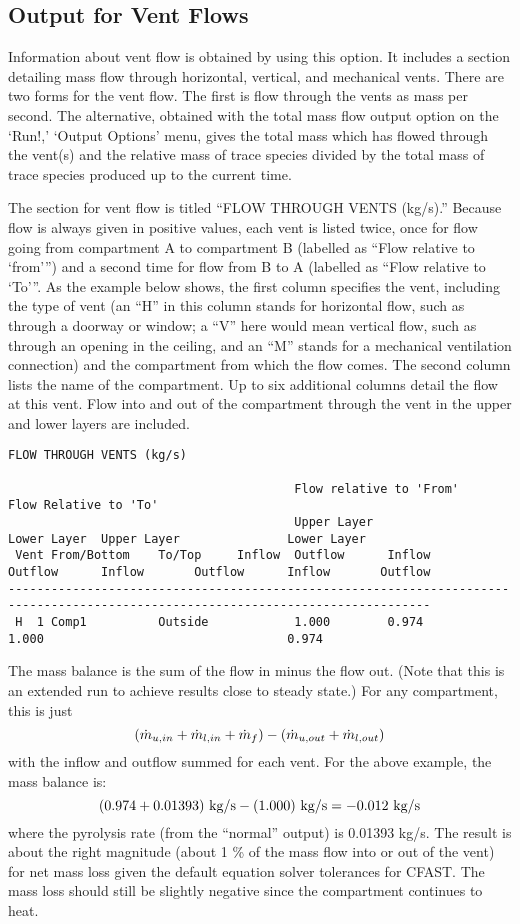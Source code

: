 \subsection{Output for Vent Flows}

Information about vent flow is obtained by using this option.  It includes a section detailing mass flow through horizontal, vertical, and mechanical vents. There are two forms for the vent flow. The first is flow through the vents as mass per second. The alternative, obtained with the total mass flow output option on the `Run!,' `Output Options' menu, gives the total mass which has flowed through the vent(s) and the relative mass of trace species divided by the total mass of trace species produced up to the current time.

The section for vent flow is titled ``FLOW THROUGH VENTS (kg/s).''  Because flow is always given in positive values, each vent is listed twice, once for flow going from compartment A to compartment B (labelled as ``Flow relative to `from''') and a second time for flow from B to A (labelled as ``Flow relative to `To'''.  As the example below shows, the first column specifies the vent, including the type of vent (an ``H'' in this column stands for horizontal flow, such as through a doorway or window; a ``V'' here would mean vertical flow, such as through an opening in the ceiling, and an ``M'' stands for a mechanical ventilation connection) and the compartment from which the flow comes. The second column lists the name of the compartment. Up to six additional columns detail the flow at this vent. Flow into and out of the compartment through the vent in the upper and lower layers are included.

\begin{lstlisting}[basicstyle=\tiny]
 FLOW THROUGH VENTS (kg/s)

                                        Flow relative to 'From'                Flow Relative to 'To'
                                        Upper Layer               Lower Layer  Upper Layer               Lower Layer
 Vent From/Bottom    To/Top     Inflow  Outflow      Inflow       Outflow      Inflow       Outflow      Inflow       Outflow
---------------------------------------------------------------------------------------------------------------------------------
 H  1 Comp1          Outside            1.000        0.974                     1.000                                  0.974
\end{lstlisting}
The mass balance is the sum of the flow in minus the flow out. (Note that this is an extended run to achieve results close to steady state.) For any compartment, this is just
$$
{ \left( {\dot{m}_{u,in} + \dot{m}_{l,in} + \dot{m}_f} \right) } - { \left( {\dot{m}_{u,out} + \dot{m}_{l,out}} \right) }
$$
with the inflow and outflow summed for each vent. For the above example, the mass balance is:
$$(0.974 + 0.01393)~\hbox{kg/s} - (1.000)~\hbox{kg/s} = -0.012~\hbox{kg/s}$$
where the pyrolysis rate (from the ``normal'' output) is 0.01393 kg/s. The result is about the right magnitude (about 1 \% of the mass flow into or out of the vent) for net mass loss given the default equation solver tolerances for CFAST.  The mass loss should still be slightly negative since the compartment continues to heat.

